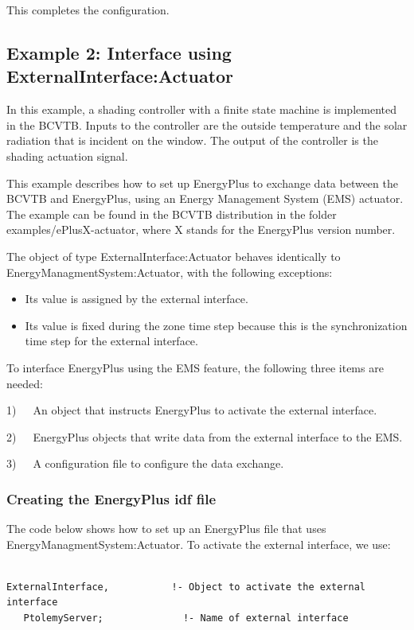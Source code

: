 This completes the configuration.

\subsection{Example 2: Interface using ExternalInterface:Actuator}\label{example-2-interface-using-externalinterfaceactuator}

In this example, a shading controller with a finite state machine is implemented in the BCVTB. Inputs to the controller are the outside temperature and the solar radiation that is incident on the window. The output of the controller is the shading actuation signal.

This example describes how to set up EnergyPlus to exchange data between the BCVTB and EnergyPlus, using an Energy Management System (EMS) actuator. The example can be found in the BCVTB distribution in the folder examples/ePlusX-actuator, where X stands for the EnergyPlus version number.

The object of type ExternalInterface:Actuator behaves identically to EnergyManagmentSystem:Actuator, with the following exceptions:

\begin{itemize}
\item
  Its value is assigned by the external interface.
\item
  Its value is fixed during the zone time step because this is the synchronization time step for the external interface.
\end{itemize}

To interface EnergyPlus using the EMS feature, the following three items are needed:

1)~~~An object that instructs EnergyPlus to activate the external interface.

2)~~~EnergyPlus objects that write data from the external interface to the EMS.

3)~~~A configuration file to configure the data exchange.

\subsubsection{Creating the EnergyPlus idf file}\label{creating-the-energyplus-idf-file-1}

The code below shows how to set up an EnergyPlus file that uses EnergyManagmentSystem:Actuator. To activate the external interface, we use:

\begin{lstlisting}

ExternalInterface,           !- Object to activate the external interface
   PtolemyServer;              !- Name of external interface
\end{lstlisting}

